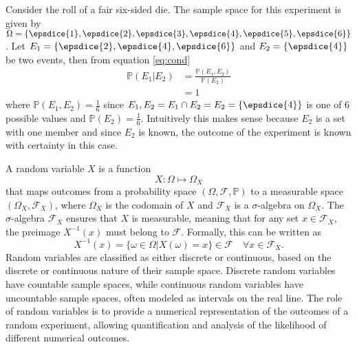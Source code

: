 \begin{example}
	Consider the roll of a fair six-sided die. The sample space for this experiment is given by $\Omega = \{ \epsdice{1}, \epsdice{2}, \epsdice{3}, \epsdice{4}, \epsdice{5}, \epsdice{6} \}$. Let $E_1 = \{\epsdice{2}, \epsdice{4}, \epsdice{6}\}$ and $E_2 = \{\epsdice{4}\}$ be two events, then from equation \eqref{eq:cond}
	\begin{equation}
		\begin{split}
			\mathbb{P}(E_1|E_2) &= \frac{\mathbb{P}(E_1, E_2)}{\mathbb{P}(E_2)}\\
			& = 1
		\end{split}
	\end{equation}
	where $\mathbb{P}(E_1,E_2)= \frac{1}{6}$ since $E_1,E_2 = E_1\cap E_2 = E_2=\{\epsdice{4}\}$ is one of $6$ possible values and $\mathbb{P}(E_2) = \frac{1}{6}$. Intuitively this makes sense because $E_2$ is a set with one member and since $E_2$ is known, the outcome of the experiment is known with certainty in this case.
\end{example}

\begin{definition}
	\label{def:random_Variable}
	A random variable $X$ is a function 
	\begin{equation}
		X: \Omega \mapsto \Omega_X
	\end{equation}
	that maps outcomes from a probability space $(\Omega, \mathcal{F}, \mathbb{P})$ to a measurable space $(\Omega_X, \mathcal{F}_X)$, where $\Omega_X$ is the codomain of $X$ and $\mathcal{F}_X$ is a $\sigma$-algebra on $\Omega_X$. The $\sigma$-algebra $\mathcal{F}_X$ ensures that $X$ is measurable, meaning that for any set $x \in \mathcal{F}_X$, the preimage $X^{-1}(x)$ must belong to $\mathcal{F}$. Formally, this can be written as
	\begin{equation}
		X^{-1}(x) = \{\omega \in \Omega | X(\omega) = x\} \in \mathcal{F} \quad \forall x \in \mathcal{F}_X.
	\end{equation}
	Random variables are classified as either discrete or continuous, based on the discrete or continuous nature of their sample space. Discrete random variables have countable sample spaces, while continuous random variables have uncountable sample spaces, often modeled as intervals on the real line. The role of random variables is to provide a numerical representation of the outcomes of a random experiment, allowing quantification and analysis of the likelihood of different numerical outcomes. 
\end{definition}

